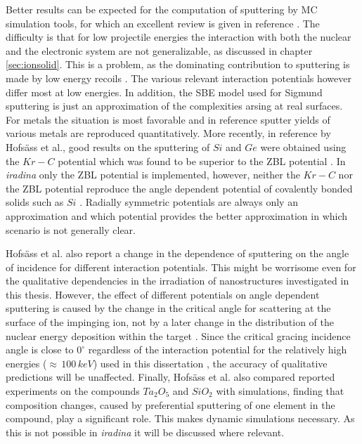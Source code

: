 Better results can be expected for the computation of sputtering by MC simulation tools, for which an excellent review is given in reference \cite{biersack_computer_1987}. The difficulty is that for low projectile energies the interaction with both the nuclear and the electronic system are not generalizable, as discussed in chapter \ref{sec:ionsolid}. This is a problem, as the dominating contribution to sputtering is made by low energy recoils \cite{thompson_energy_1968}. The various relevant interaction potentials however differ most at low energies. In addition, the SBE model used for Sigmund sputtering is just an approximation of the complexities arsing at real surfaces. For metals the situation is most favorable and in reference \cite{biersack_computer_1987} sputter yields of various metals are reproduced quantitatively. More recently, in reference \cite{hofsass_simulation_2014} by Hofsäss et al., good results on the sputtering of $Si$ and $Ge$ were obtained using the $Kr-C$ \cite{wilson_calculations_1977} potential which was found to be superior to the ZBL potential \cite{ziegler_stopping_1985}. In \emph{iradina} only the ZBL potential is implemented, however, neither the $Kr-C$ nor the ZBL potential reproduce the angle dependent potential of covalently bonded solids such as $Si$ \cite{stillinger_computer_1985,tersoff_new_1988}. Radially symmetric potentials are always only an approximation and which potential provides the better approximation in which scenario is not generally clear.

Hofsäss et al. \cite{hofsass_simulation_2014} also report a change in the dependence of sputtering on the angle of incidence for different interaction potentials. This might be worrisome even for the qualitative dependencies in the irradiation of nanostructures investigated in this thesis. However, the effect of different potentials on angle dependent sputtering is caused by the change in the critical angle for scattering at the surface of the impinging ion, not by a later change in the distribution of the nuclear energy deposition within the target \cite{eckstein_influence_1992}. Since the critical gracing incidence angle is close to $0^\circ$ regardless of the interaction potential for the relatively high energies ($\approx\,100\,keV$) used in this dissertation \cite{yamamura_empirical_1984}, the accuracy of qualitative predictions will be unaffected. Finally, Hofsäss et al. \cite{hofsass_simulation_2014} also compared reported experiments on the compounds $Ta_2O_5$ and $SiO_2$ with simulations, finding that composition changes, caused by preferential sputtering of one element in the compound, play a significant role. This makes dynamic simulations necessary. As this is not possible in \emph{iradina} it will be discussed where relevant.


